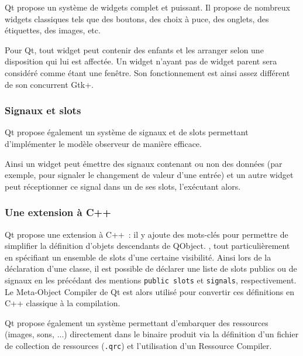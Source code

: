 Qt propose un système de widgets complet et puissant. Il propose de nombreux widgets classiques tels que des boutons, des choix à puce, des onglets, des étiquettes, des images, etc.

Pour Qt, tout widget peut contenir des enfants et les arranger selon une disposition qui lui est affectée. Un widget n'ayant pas de widget parent sera considéré comme étant une fenêtre.
Son fonctionnement est ainsi assez différent de son concurrent Gtk+.

\subsubsection{Signaux et slots}

Qt propose également un système de signaux et de slots permettant d'implémenter le modèle observeur de manière efficace.%

Ainsi un widget peut émettre des signaux contenant ou non des données (par exemple, pour signaler le changement de valeur d'une entrée) et un autre widget peut réceptionner ce signal dans un de ses slots, l'exécutant alors. %

\subsubsection{Une extension à C++}

Qt propose une extension à C++~: il y ajoute des mots-clés pour permettre de simplifier la définition d'objets descendants de QObject.
, tout particulièrement en spécifiant un ensemble de slots d'une certaine visibilité.
Ainsi lors de la déclaration d'une classe, il est possible de déclarer une liste de slots publics ou de signaux en les précédant des mentions \verb|public slots| et \verb|signals|, respectivement.
Le Meta-Object Compiler de Qt est alors utilisé pour convertir ces définitions en C++ classique à la compilation.

Qt propose également un système permettant d'embarquer des ressources (images, sons, ...) directement dans le binaire produit via la définition d'un fichier de collection de ressources (\verb|.qrc|) et l'utilisation d'un Ressource Compiler.

